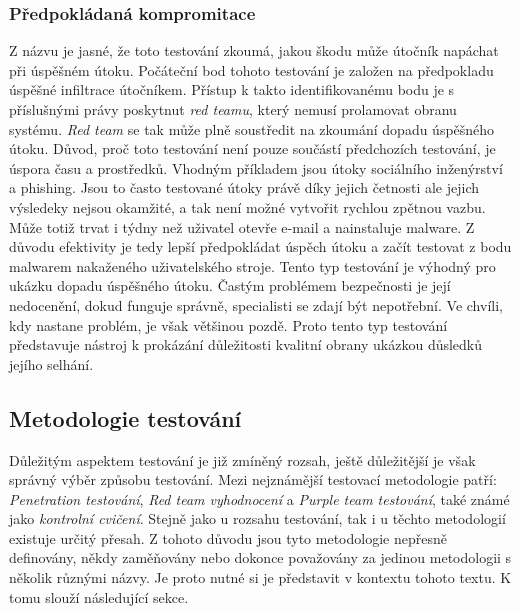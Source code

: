\subsubsection{Předpokládaná kompromitace}
Z názvu je jasné, že toto testování zkoumá, jakou škodu může útočník napáchat při úspěšném útoku.
Počáteční bod tohoto testování je založen na předpokladu úspěšné infiltrace útočníkem.
Přístup k takto identifikovanému bodu je s příslušnými právy poskytnut \textit{red teamu}, který nemusí prolamovat obranu systému.
\textit{Red team} se tak může plně soustředit na zkoumání dopadu úspěšného útoku.
Důvod, proč toto testování není pouze součástí předchozích testování, je úspora času a prostředků.
Vhodným příkladem jsou útoky sociálního inženýrství a phishing.
Jsou to často testované útoky právě díky jejich četnosti ale jejich výsledeky nejsou okamžité, a tak není možné vytvořit rychlou zpětnou vazbu.
Může totiž trvat i týdny než uživatel otevře e-mail a nainstaluje malware.\cite{red_team_oakley_2019}
Z důvodu efektivity je tedy lepší předpokládat úspěch útoku a začít testovat z bodu malwarem nakaženého uživatelského stroje.
Tento typ testování je výhodný pro ukázku dopadu úspěšného útoku.
Častým problémem bezpečnosti je její nedocenění, dokud funguje správně, specialisti se zdají být nepotřební.
Ve chvíli, kdy nastane problém, je však většinou pozdě.
Proto tento typ testování představuje nástroj k prokázání důležitosti kvalitní obrany ukázkou důsledků jejího selhání.

\subsection{Metodologie testování}\label{subsec:metodologie-testovani}
Důležitým aspektem testování je již zmíněný rozsah, ještě důležitější je však správný výběr způsobu testování.
Mezi nejznámější testovací metodologie patří: \textit{Penetration testování}, \textit{Red team vyhodnocení} a \textit{Purple team testování}, také známé jako \textit{kontrolní cvičení}.
Stejně jako u rozsahu testování, tak i u těchto metodologií existuje určitý přesah.
Z tohoto důvodu jsou tyto metodologie nepřesně definovány, někdy zaměňovány nebo dokonce považovány za jedinou metodologii s několik různými názvy.
Je proto nutné si je představit v kontextu tohoto textu.
K tomu slouží následující sekce.\cite{securityInteligence_pen_test_red_team_purple_team}

